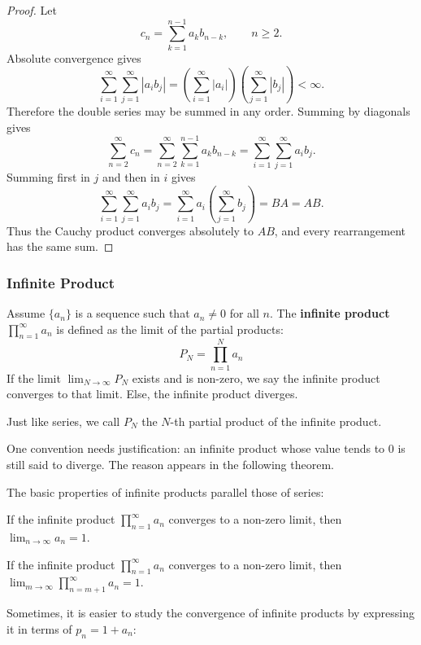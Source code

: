 \begin{proof}
Let
\[
    c_n=\sum_{k=1}^{n-1}a_kb_{n-k},\qquad n\ge2.
\]
Absolute convergence gives
\[
\sum_{i=1}^{\infty}\sum_{j=1}^{\infty}|a_i b_j|
=\left(\sum_{i=1}^{\infty}|a_i|\right)
 \left(\sum_{j=1}^{\infty}|b_j|\right)<\infty.
\]
Therefore the double series may be summed in any order. Summing by diagonals gives
\[
\sum_{n=2}^{\infty}c_n
=\sum_{n=2}^{\infty}\sum_{k=1}^{n-1}a_kb_{n-k}
=\sum_{i=1}^{\infty}\sum_{j=1}^{\infty}a_i b_j.
\]
Summing first in $j$ and then in $i$ gives
\[
\sum_{i=1}^{\infty}\sum_{j=1}^{\infty}a_i b_j
=\sum_{i=1}^{\infty}a_i\left(\sum_{j=1}^{\infty}b_j\right)
=BA=AB.
\]
Thus the Cauchy product converges absolutely to $AB$, and every rearrangement has the same sum.
\end{proof}

\subsubsection{Infinite Product}
\begin{definition}
    Assume $\{a_n\}$ is a sequence such that $a_n \neq 0$ for all $n$. The \textbf{infinite product} $\prod_{n=1}^{\infty} a_n$ is defined as the limit of the partial products:
    \[ P_N = \prod_{n=1}^{N} a_n \]
    If the limit $\lim_{N \to \infty} P_N$ exists and is non-zero, we say the infinite product converges to that limit.
    Else, the infinite product diverges.
\end{definition}

Just like series, we call $P_N$ the $N$-th partial product of the infinite product.

One convention needs justification: an infinite product whose value tends to $0$ is still said to diverge. The reason appears in the following theorem.

The basic properties of infinite products parallel those of series:

\begin{theorem}
    If the infinite product $\prod_{n=1}^{\infty} a_n$ converges to a non-zero limit, then $\lim_{n \to \infty} a_n = 1$.
    
    If the infinite product $\prod_{n=1}^{\infty} a_n$ converges to a non-zero limit, then $\lim_{m \to \infty} \prod_{n=m+1}^{\infty} a_n = 1$.
\end{theorem}

Sometimes, it is easier to study the convergence of infinite products by expressing it in terms of $p_n = 1 + a_n$:

